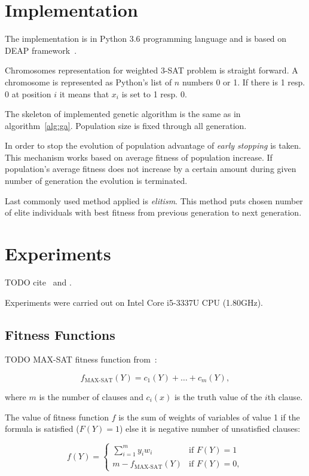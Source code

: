\documentclass{article}
\begin{document}
\section{Implementation}

The implementation is in Python 3.6 programming language
and is based on DEAP framework~\cite{fortin2012}.

Chromosomes representation for weighted 3-SAT problem is straight forward.
A chromosome is represented as Python's list of $n$ numbers 0 or 1.
If there is 1 resp. 0 at position $i$ it means that $x_i$ is set to 1 resp. 0.

The skeleton of implemented genetic algorithm is the same as
in algorithm~\ref{alg:ga}.
Population size is fixed through all generation.

In order to stop the evolution of population advantage of
\textit{early stopping} is taken.
This mechanism works based on average fitness of population increase.
If population's average fitness does not increase by a certain amount
during given number of generation the evolution is terminated.

Last commonly used method applied is \textit{elitism}.
This method puts chosen number of elite individuals with best fitness
from previous generation to next generation.

\section{Experiments}

TODO cite~\cite{gottlieb2002} and \cite{ellerweg2004}.

Experiments were carried out on Intel Core i5-3337U CPU (1.80GHz).

\subsection{Fitness Functions}

TODO MAX-SAT fitness function from~\cite{dejong1989}:

$$f_{\text{MAX-SAT}}(Y) = c_1(Y) + \dots + c_m(Y),$$

where $m$ is the number of clauses and $c_i(x)$ is the truth value of the $i$th
clause.

The value of fitness function $f$ is the sum of weights of variables of value 1
if the formula is satisfied ($F(Y) = 1$)
else it is negative number of unsatisfied clauses:

$$
f(Y) = 
\begin{cases} 
    \sum_{i = 1}^m y_i w_i & \text{if } F(Y) = 1 \\
    m - f_{\text{MAX-SAT}}(Y) & \text{if } F(Y) = 0,
\end{cases}
$$
\end{document}
